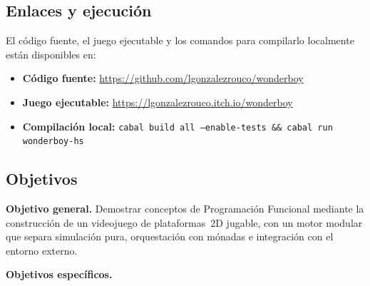 \subsection{Enlaces y ejecución}
\label{subsec:intro-enlaces}

El código fuente, el juego ejecutable y los comandos para compilarlo localmente están
disponibles en:

\begin{itemize}
  \item \textbf{Código fuente:}
    \url{https://github.com/lgonzalezrouco/wonderboy}
  \item \textbf{Juego ejecutable:}
    \url{https://lgonzalezrouco.itch.io/wonderboy}
  \item \textbf{Compilación local:}
    \texttt{cabal build all --enable-tests \&\& cabal run wonderboy-hs}
\end{itemize}

\subsection{Objetivos}
\label{subsec:intro-objetivos}

\textbf{Objetivo general.}
Demostrar conceptos de Programación Funcional mediante la construcción de un videojuego de
plataformas~2D jugable, con un motor modular que separa simulación pura, orquestación con
mónadas e integración con el entorno externo.

\textbf{Objetivos específicos.}

